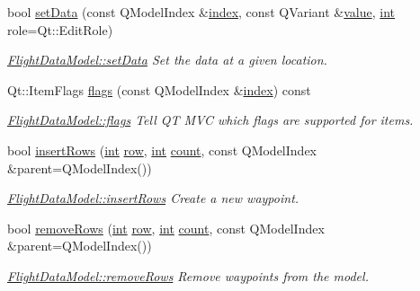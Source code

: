 \begin{DoxyCompactItemize}
bool \hyperlink{group___path_ga8931eaae5c2004c4d42233bcdad3ee4d}{set\-Data} (const Q\-Model\-Index \&\hyperlink{glext_8h_ab47dd9958bcadea08866b42bf358e95e}{index}, const Q\-Variant \&\hyperlink{glext_8h_aa0e2e9cea7f208d28acda0480144beb0}{value}, \hyperlink{ioapi_8h_a787fa3cf048117ba7123753c1e74fcd6}{int} role=Qt\-::\-Edit\-Role)
\begin{DoxyCompactList}\small\item\em \hyperlink{group___path_ga8931eaae5c2004c4d42233bcdad3ee4d}{Flight\-Data\-Model\-::set\-Data} Set the data at a given location. \end{DoxyCompactList}\item 
Qt\-::\-Item\-Flags \hyperlink{group___path_gaeabf907ec7c9cfc6c410c2dd6678e603}{flags} (const Q\-Model\-Index \&\hyperlink{glext_8h_ab47dd9958bcadea08866b42bf358e95e}{index}) const 
\begin{DoxyCompactList}\small\item\em \hyperlink{group___path_gaeabf907ec7c9cfc6c410c2dd6678e603}{Flight\-Data\-Model\-::flags} Tell Q\-T M\-V\-C which flags are supported for items. \end{DoxyCompactList}\item 
bool \hyperlink{group___path_ga17a5cd58322554d7fadb0c84031deb26}{insert\-Rows} (\hyperlink{ioapi_8h_a787fa3cf048117ba7123753c1e74fcd6}{int} \hyperlink{glext_8h_a11b277b422822f784ee248b43eee3e1e}{row}, \hyperlink{ioapi_8h_a787fa3cf048117ba7123753c1e74fcd6}{int} \hyperlink{glext_8h_a5b40aca7a9682963dd00a8f5aef0a901}{count}, const Q\-Model\-Index \&parent=Q\-Model\-Index())
\begin{DoxyCompactList}\small\item\em \hyperlink{group___path_ga17a5cd58322554d7fadb0c84031deb26}{Flight\-Data\-Model\-::insert\-Rows} Create a new waypoint. \end{DoxyCompactList}\item 
bool \hyperlink{group___path_ga951208986321a56cc67eafa5a9d67f0e}{remove\-Rows} (\hyperlink{ioapi_8h_a787fa3cf048117ba7123753c1e74fcd6}{int} \hyperlink{glext_8h_a11b277b422822f784ee248b43eee3e1e}{row}, \hyperlink{ioapi_8h_a787fa3cf048117ba7123753c1e74fcd6}{int} \hyperlink{glext_8h_a5b40aca7a9682963dd00a8f5aef0a901}{count}, const Q\-Model\-Index \&parent=Q\-Model\-Index())
\begin{DoxyCompactList}\small\item\em \hyperlink{group___path_ga951208986321a56cc67eafa5a9d67f0e}{Flight\-Data\-Model\-::remove\-Rows} Remove waypoints from the model. \end{DoxyCompactList}\item 

\end{DoxyCompactItemize}
